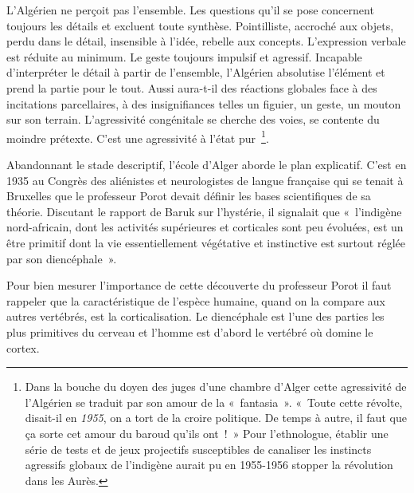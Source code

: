 \documentclass[french,twoside]{book} %
\begin{document}
 \noindent L’Algérien ne perçoit pas l’ensemble. Les questions qu’il se pose concernent toujours les détails et excluent toute synthèse. Pointilliste, accroché aux objets, perdu dans le détail, insensible à l’idée, rebelle aux concepts. L’expression verbale est réduite au minimum. Le geste toujours impulsif et agressif. Incapable d’interpréter le détail à partir de l’ensemble, l’Algérien absolutise l’élément et prend la partie pour le tout. Aussi aura-t-il des réactions globales face à des incitations parcellaires, à des insignifiances telles un figuier, un geste, un mouton sur son terrain. L’agressivité congénitale se cherche des voies, se contente du moindre prétexte. C’est une agressivité à l’état pur \footnote{Dans la bouche du doyen des juges d’une chambre d’Alger cette agressivité de l’Algérien se traduit par son amour de la « fantasia ». « Toute cette révolte, disait-il en \emph{1955}, on a tort de la croire politique. De temps à autre, il faut que ça sorte cet amour du baroud qu’ils ont ! » Pour l’ethnologue, établir une série de tests et de jeux projectifs susceptibles de canaliser les instincts agressifs globaux de l’indigène aurait pu en 1955-1956 stopper la révolution dans les Aurès.}.\par
Abandonnant le stade descriptif, l’école d’Alger aborde le plan explicatif. C’est en 1935 au Congrès des aliénistes et neurologistes de langue française qui se tenait à Bruxelles que le professeur Porot devait définir les bases scientifiques de sa théorie. Discutant le rapport de Baruk sur l’hystérie, il signalait que « l’indigène nord-africain, dont les activités supérieures et corticales sont peu évoluées, est un être primitif dont la vie essentiellement végétative et instinctive est surtout réglée par son diencéphale ».\par
Pour bien mesurer l’importance de cette découverte du professeur Porot il faut rappeler que la caractéristique de l’espèce humaine, quand on la compare aux autres vertébrés, est la corticalisation. Le diencéphale est l’une des parties les plus primitives du cerveau et l’homme est d’abord le vertébré où domine le cortex.\par
\end{document}

